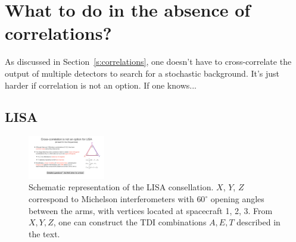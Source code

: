 \section{What to do in the absence of correlations?}

As discussed in Section~\ref{s:correlations}, one doesn't
have to cross-correlate the output of multiple detectors
to search for a stochastic background.
It's just harder if correlation is not an option.
If one knows...

\subsection{LISA}

\begin{figure}[htbp!]
\begin{center}
\includegraphics[width=0.3\textwidth]{Figures/LISA_XYZ}
\caption{Schematic representation of the LISA consellation.
$X$, $Y$, $Z$ correspond to Michelson interferometers 
with $60^\circ$ opening angles between the arms, with vertices
located at spacecraft 1, 2, 3.
From $X, Y, Z$, one can construct the TDI combinations
$A, E, T$ described in the text.}
\label{f:LISA_XYZ}
\end{center}
\end{figure}

